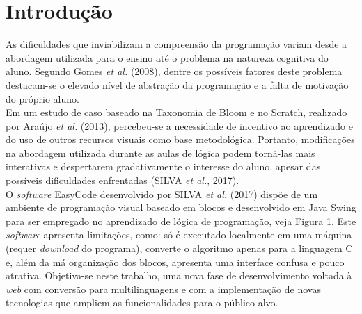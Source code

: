 \documentclass[12pt]{article}
\begin{document}
\section{Introdução}
As dificuldades que inviabilizam a compreensão da programação variam desde a abordagem utilizada para o ensino até o problema na natureza cognitiva do aluno. Segundo Gomes \textit{et al.} (2008), dentre os possíveis fatores deste problema destacam-se o elevado nível de abstração da programação e a falta de motivação do próprio aluno. 
\\Em um estudo de caso baseado na Taxonomia de Bloom e no Scratch, realizado por Araújo \textit{et al.} (2013), percebeu-se a necessidade de incentivo ao aprendizado e do uso de outros recursos visuais como base metodológica. Portanto, modificações na abordagem utilizada durante as aulas de lógica podem torná-las mais interativas e despertarem gradativamente o interesse do aluno, apesar das possíveis dificuldades enfrentadas (SILVA \textit{et al.}, 2017).
\\O \textit{software} EasyCode desenvolvido por SILVA \textit{et al.} (2017) dispõe de um ambiente de programação visual baseado em blocos e desenvolvido em Java Swing para ser empregado no aprendizado de lógica de programação, veja Figura 1. Este \textit{software} apresenta limitações, como: só é executado localmente em uma máquina (requer \textit{download} do programa), converte o algoritmo apenas para a linguagem C e, além da má organização dos blocos, apresenta uma interface confusa e pouco atrativa. Objetiva-se neste trabalho, uma nova fase de desenvolvimento voltada à \textit{web} com conversão para multilinguagens e com a implementação de novas tecnologias que ampliem as funcionalidades para o público-alvo.
\end{document}
